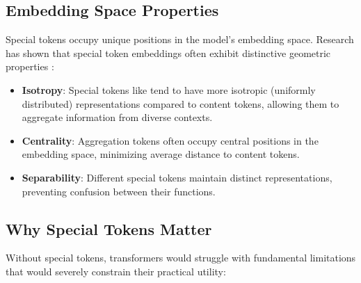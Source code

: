 \subsection{Embedding Space Properties}

Special tokens occupy unique positions in the model's embedding space. Research has shown that special token embeddings often exhibit distinctive geometric properties \citep{clark2019what, rogers2020primer}:

\begin{itemize}
\item \textbf{Isotropy}: Special tokens like \cls{} tend to have more isotropic (uniformly distributed) representations compared to content tokens, allowing them to aggregate information from diverse contexts.

\item \textbf{Centrality}: Aggregation tokens often occupy central positions in the embedding space, minimizing average distance to content tokens.

\item \textbf{Separability}: Different special tokens maintain distinct representations, preventing confusion between their functions.
\end{itemize}

\subsection{Why Special Tokens Matter}

Without special tokens, transformers would struggle with fundamental limitations that would severely constrain their practical utility:

